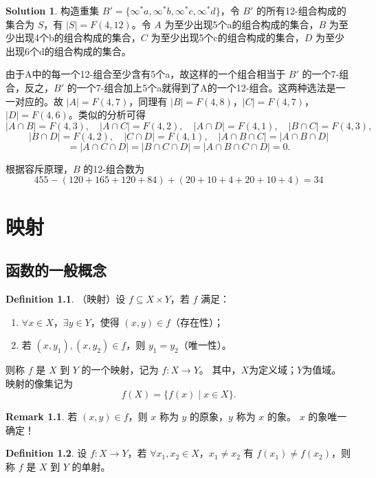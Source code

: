 \documentclass[oneside]{book}
\theoremstyle{definition}
\newtheorem{definition}{Definition}[section]
\newtheorem{remark}{Remark}[section]
\newtheorem*{sol}{Solution}
\begin{document}
	\begin{sol}
		构造重集 \( B'=\{\infty^*a, \infty^*b, \infty^*c, \infty^*d\} \)，令 \( B' \) 的所有12-组合构成的集合为 \( S \)，有 \( |S|=F(4,12) \)。令 \( A \) 为至少出现5个a的组合构成的集合，\( B \) 为至少出现4个b的组合构成的集合，\( C \) 为至少出现5个c的组合构成的集合，\( D \) 为至少出现6个d的组合构成的集合。
	
	由于A中的每一个12-组合至少含有5个a，故这样的一个组合相当于 \( B' \) 的一个7-组合，反之，\( B' \) 的一个7-组合加上5个a就得到了A的一个12-组合。这两种选法是一一对应的。故 \( |A|=F(4,7) \)，同理有 \( |B|=F(4,8) \)，\( |C|=F(4,7) \)，\( |D|=F(4,6) \)。类似的分析可得
	\[|A \cap B|=F(4,3), \quad |A \cap C|=F(4,2), \quad |A \cap D|=F(4,1), \quad |B \cap C|=F(4,3),\]
	\[|B \cap D|=F(4,2), \quad |C \cap D|=F(4,1), \quad |A \cap B \cap C|=|A \cap B \cap D|\]
	\[=|A \cap C \cap D|=|B \cap C \cap D|=|A \cap B \cap C \cap D|=0.\]
	
	根据容斥原理，\( B \) 的12-组合数为
	\[455-(120+165+120+84)+(20+10+4+20+10+4)=34\]
	\end{sol}
	
	
	\chapter{映射}
	\section{函数的一般概念}
	
	\begin{definition}
		（映射）设 \( f \subseteq X \times Y \)，若 \( f \) 满足：
		\begin{enumerate}
			\item \( \forall x \in X \)，\( \exists y \in Y \)，使得 \( (x, y) \in f \)（存在性）；
			\item 若 \( (x, y_1), (x, y_2) \in f \)，则 \( y_1 = y_2 \)（唯一性）。
		\end{enumerate}
		则称 \( f \) 是 \( X \) 到 \( Y \) 的一个映射，记为 \( f: X \to Y \)。
		其中，\( X \)为定义域；\( Y \)为值域。
		映射的像集记为 
		\[
		f(X) = \{ f(x) \mid x \in X \}.
		\]
	\end{definition}
	
	\begin{remark}
		若 \( (x, y) \in f \)，则 \( x \) 称为 \( y \) 的原象，\( y \) 称为 \( x \) 的象。
		\( x \) 的象唯一确定！
	\end{remark}
	
	\begin{definition}
		设 \( f: X \to Y \)，若 \( \forall x_1, x_2 \in X \)，\( x_1 \neq x_2 \) 有 \( f(x_1) \neq f(x_2) \)，则称 \( f \) 是 \( X \) 到 \( Y \) 的单射。
	\end{definition}
	
\end{document}
